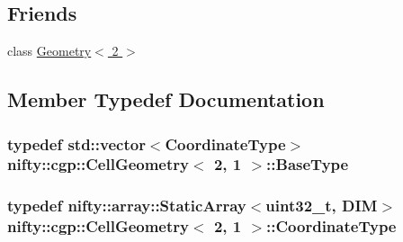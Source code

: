 \subsection*{Friends}
\begin{DoxyCompactItemize}
\item 
class \hyperlink{classnifty_1_1cgp_1_1CellGeometry_3_012_00_011_01_4_adfd68abfc6c19d6cc9ac2eb46fcfa819}{Geometry$<$ 2 $>$}
\end{DoxyCompactItemize}


\subsection{Member Typedef Documentation}
\hypertarget{classnifty_1_1cgp_1_1CellGeometry_3_012_00_011_01_4_a10f7d7a27ef9080c3a94fc69a258c55e}{}
\subsubsection[{Base\+Type}]{\setlength{\rightskip}{0pt plus 5cm}typedef std\+::vector$<${\bf Coordinate\+Type}$>$ {\bf nifty\+::cgp\+::\+Cell\+Geometry}$<$ 2, 1 $>$\+::{\bf Base\+Type}}\label{classnifty_1_1cgp_1_1CellGeometry_3_012_00_011_01_4_a10f7d7a27ef9080c3a94fc69a258c55e}
\hypertarget{classnifty_1_1cgp_1_1CellGeometry_3_012_00_011_01_4_a61e8ffb089e3ca4bf7998e77dfc278bc}{}
\subsubsection[{Coordinate\+Type}]{\setlength{\rightskip}{0pt plus 5cm}typedef {\bf nifty\+::array\+::\+Static\+Array}$<$uint32\+\_\+t, {\bf D\+I\+M}$>$ {\bf nifty\+::cgp\+::\+Cell\+Geometry}$<$ 2, 1 $>$\+::{\bf Coordinate\+Type}}\label{classnifty_1_1cgp_1_1CellGeometry_3_012_00_011_01_4_a61e8ffb089e3ca4bf7998e77dfc278bc}
\hypertarget{classnifty_1_1cgp_1_1CellGeometry_3_012_00_011_01_4_a35fae8ad3031bc0765ecb4d56cbff171}{}

